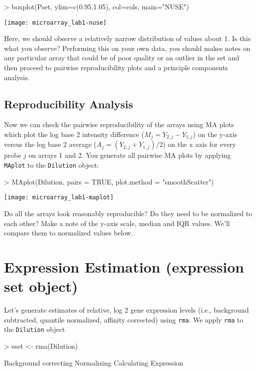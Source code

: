 \documentclass[12pt]{article}
\newcommand{\code}[1]{{\texttt{#1}}}
\begin{document}
\begin{Schunk}
\begin{Sinput}
> boxplot(Pset, ylim=c(0.95,1.05), col=cols, main="NUSE")
\end{Sinput}
\end{Schunk}
\texttt{[image: microarray\_lab1-nuse]}

Here, we should observe a relatively narrow distribution of values about 1.  Is this what you observe?  Performing this on your own data, you should makes notes on any particular array that could be of poor quality or an outlier in the set and then proceed to pairwise reproducibility plots and a principle components analysis.

\subsection{Reproducibility Analysis}

Now we can check the pairwise reproducibility of the arrays using MA plots which plot the log base 2 intensity difference ($M_j=Y_{2,j}-Y_{1,j}$) on the y-axis versus the log base 2 average ($A_j=(Y_{2,j}+Y_{1,j})/2$) on the x axis for every probe $j$ on arrays 1 and 2.  You generate all pairwise MA plots by applying \code{MAplot} to the \code{Dilution} object:

\begin{Schunk}
\begin{Sinput}
> MAplot(Dilution, pairs = TRUE, plot.method = "smoothScatter")
\end{Sinput}
\end{Schunk}
\texttt{[image: microarray\_lab1-maplot]}

Do all the arrays look reasonably reproducible?  Do they need to be normalized to each other?  Make a note of the y-axis scale, median and IQR values.  We'll compare them to normalized values below.

\section{Expression Estimation (expression set object)}

Let's generate estimates of relative, log 2 gene expression levels (i.e., background subtracted, quantile normalized, affinity corrected) using \code{rma}.  We apply \code{rma} to the \code{Dilution} object

\begin{Schunk}
\begin{Sinput}
> eset <- rma(Dilution)
\end{Sinput}
\begin{Soutput}
Background correcting
Normalizing
Calculating Expression
\end{Soutput}
\end{Schunk}
\end{document}

